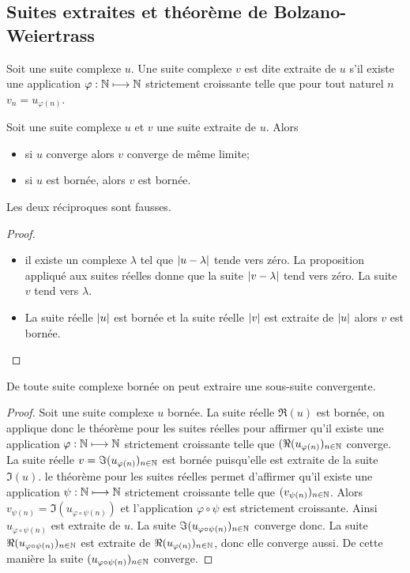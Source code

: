 \subsection{Suites extraites et théorème de Bolzano-Weiertrass}
\begin{defdef}
    Soit une suite complexe \(u\). Une suite complexe \(v\) est dite 
    extraite de \(u\) s'il existe une application \(\varphi:\mathbb{N} \longmapsto 
    \mathbb{N}\) strictement croissante telle que pour tout naturel \(n\) \(v_n = 
    u_{\varphi(n)}\).
\end{defdef}
\begin{prop}
    Soit une suite complexe \(u\) et \(v\) une suite extraite de \(u\). 
    Alors
    \begin{itemize}
        \item si \(u\) converge alors \(v\) converge de même limite;
        \item si \(u\) est bornée, alors \(v\) est bornée.
    \end{itemize}
    Les deux réciproques sont fausses.
\end{prop}
\begin{proof}
    \begin{itemize}
        \item il existe un complexe \(\lambda\) tel que \(\left\lvert u-\lambda\right\rvert\) 
            tende vers zéro. La proposition appliqué aux suites réelles donne 
            que la suite \(\left\lvert v-\lambda\right\rvert\) tend vers zéro. La suite \(v\) 
            tend vers \(\lambda\).
        \item La suite réelle \(\left\lvert u\right\rvert\) est bornée et la suite réelle 
            \(\left\lvert v\right\rvert\) est extraite de \(\left\lvert u\right\rvert\) alors \(v\) est bornée.
    \end{itemize}
\end{proof}
\begin{theo}
    De toute suite complexe bornée on peut extraire une sous-suite 
    convergente.
\end{theo}
\begin{proof}
    Soit une suite complexe \(u\) bornée. La suite réelle \(\Re(u)\) est 
    bornée, on applique donc le théorème pour les suites réelles pour 
    affirmer qu'il existe une application \(\varphi:\mathbb{N} \longmapsto \mathbb{N}\) 
    strictement croissante telle que \((\Re(u_{\varphi(n)})_{n \in \mathbb{N}}\) 
    converge. La suite réelle \(v = \Im(u_{\varphi(n)})_{n \in \mathbb{N}}\) est 
    bornée puisqu'elle est extraite de la suite \(\Im(u)\). le théorème 
    pour les suites réelles permet d'affirmer qu'il existe une application 
    \(\psi:\mathbb{N} \longmapsto \mathbb{N}\) strictement croissante telle que 
    \((v_{\psi(n)})_{n \in \mathbb{N}}\). Alors \(v_{\psi(n)} = \Im(u_{\varphi 
    \circ \psi(n)})\) et l'application \(\varphi \circ \psi\) est 
    strictement croissante. Ainsi \(u_{\varphi \circ \psi(n)}\) est 
    extraite de \(u\). La suite \(\Im(u_{\varphi \circ \psi(n)})_{n \in 
    \mathbb{N}}\) converge donc. La suite \(\Re(u_{\varphi \circ \psi(n)})_{n \in 
    \mathbb{N}}\) est extraite de \(\Re(u_{\varphi(n)})_{n \in \mathbb{N}}\), donc elle 
    converge aussi. De cette manière la suite \((u_{\varphi \circ 
    \psi(n)})_{n \in \mathbb{N}}\) converge.
\end{proof}

